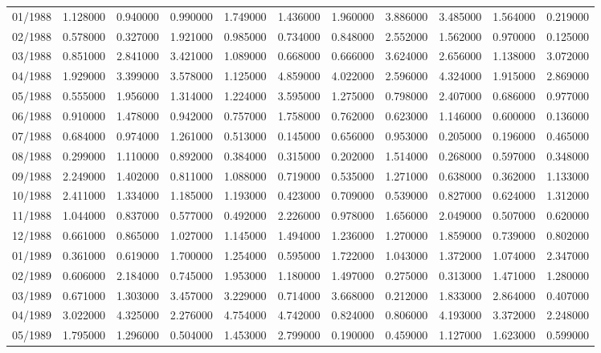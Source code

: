\begin{tabular}{lrrrrrrrrrr}
01/1988 & 1.128000 & 0.940000 & 0.990000 & 1.749000 & 1.436000 & 1.960000 & 3.886000 & 3.485000 & 1.564000 & 0.219000 \\
02/1988 & 0.578000 & 0.327000 & 1.921000 & 0.985000 & 0.734000 & 0.848000 & 2.552000 & 1.562000 & 0.970000 & 0.125000 \\
03/1988 & 0.851000 & 2.841000 & 3.421000 & 1.089000 & 0.668000 & 0.666000 & 3.624000 & 2.656000 & 1.138000 & 3.072000 \\
04/1988 & 1.929000 & 3.399000 & 3.578000 & 1.125000 & 4.859000 & 4.022000 & 2.596000 & 4.324000 & 1.915000 & 2.869000 \\
05/1988 & 0.555000 & 1.956000 & 1.314000 & 1.224000 & 3.595000 & 1.275000 & 0.798000 & 2.407000 & 0.686000 & 0.977000 \\
06/1988 & 0.910000 & 1.478000 & 0.942000 & 0.757000 & 1.758000 & 0.762000 & 0.623000 & 1.146000 & 0.600000 & 0.136000 \\
07/1988 & 0.684000 & 0.974000 & 1.261000 & 0.513000 & 0.145000 & 0.656000 & 0.953000 & 0.205000 & 0.196000 & 0.465000 \\
08/1988 & 0.299000 & 1.110000 & 0.892000 & 0.384000 & 0.315000 & 0.202000 & 1.514000 & 0.268000 & 0.597000 & 0.348000 \\
09/1988 & 2.249000 & 1.402000 & 0.811000 & 1.088000 & 0.719000 & 0.535000 & 1.271000 & 0.638000 & 0.362000 & 1.133000 \\
10/1988 & 2.411000 & 1.334000 & 1.185000 & 1.193000 & 0.423000 & 0.709000 & 0.539000 & 0.827000 & 0.624000 & 1.312000 \\
11/1988 & 1.044000 & 0.837000 & 0.577000 & 0.492000 & 2.226000 & 0.978000 & 1.656000 & 2.049000 & 0.507000 & 0.620000 \\
12/1988 & 0.661000 & 0.865000 & 1.027000 & 1.145000 & 1.494000 & 1.236000 & 1.270000 & 1.859000 & 0.739000 & 0.802000 \\
01/1989 & 0.361000 & 0.619000 & 1.700000 & 1.254000 & 0.595000 & 1.722000 & 1.043000 & 1.372000 & 1.074000 & 2.347000 \\
02/1989 & 0.606000 & 2.184000 & 0.745000 & 1.953000 & 1.180000 & 1.497000 & 0.275000 & 0.313000 & 1.471000 & 1.280000 \\
03/1989 & 0.671000 & 1.303000 & 3.457000 & 3.229000 & 0.714000 & 3.668000 & 0.212000 & 1.833000 & 2.864000 & 0.407000 \\
04/1989 & 3.022000 & 4.325000 & 2.276000 & 4.754000 & 4.742000 & 0.824000 & 0.806000 & 4.193000 & 3.372000 & 2.248000 \\
05/1989 & 1.795000 & 1.296000 & 0.504000 & 1.453000 & 2.799000 & 0.190000 & 0.459000 & 1.127000 & 1.623000 & 0.599000 \\

\end{tabular}
